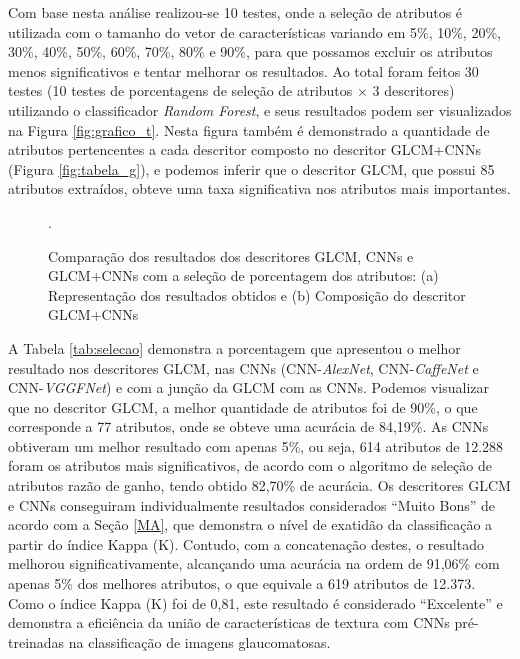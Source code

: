 \documentclass[fleqn,10pt]{SelfArx} %
\begin{document}
Com base nesta análise realizou-se 10 testes, onde a seleção de atributos é utilizada com o tamanho do vetor de características variando em 5\%, 10\%, 20\%, 30\%, 40\%, 50\%, 60\%, 70\%,
80\% e 90\%, para que possamos excluir os atributos menos significativos e tentar melhorar os resultados. 
Ao total foram feitos 30 testes (10 testes de porcentagens de seleção de atributos $\times$ 3 descritores) utilizando o classificador \textit{Random Forest}, e seus resultados podem ser visualizados na Figura \ref{fig:grafico_t}. Nesta figura também é demonstrado a quantidade de atributos pertencentes a cada descritor composto no descritor GLCM+CNNs (Figura \ref{fig:tabela_g}), e podemos inferir que o descritor GLCM, que possui 85 atributos extraídos, obteve uma taxa significativa nos atributos mais importantes.

\begin{figure*}[h!]
	\centering
	
	\caption{Comparação dos resultados dos descritores GLCM, CNNs e GLCM+CNNs com a seleção de porcentagem dos atributos: (a) Representação dos resultados obtidos e (b) Composição do descritor GLCM+CNNs}.
	\label{fig:grafico}
\end{figure*}


A Tabela \ref{tab:selecao} demonstra a porcentagem que apresentou o melhor resultado nos descritores GLCM, nas CNNs (CNN-\textit{AlexNet}, CNN-\textit{CaffeNet} e CNN-\textit{VGGFNet}) e com a junção da GLCM com as CNNs. Podemos visualizar que no descritor GLCM, a melhor quantidade de atributos foi de 90\%, o que corresponde a 77 atributos, onde se obteve uma acurácia de 84,19\%. As CNNs obtiveram um melhor resultado com apenas 5\%, ou seja, 614 atributos de 12.288 foram os atributos mais significativos, de acordo com o algoritmo de seleção de atributos razão de ganho, tendo obtido 82,70\% de acurácia. Os descritores GLCM e CNNs conseguiram individualmente resultados considerados ``Muito Bons'' de acordo com a Seção \ref{MA}, que demonstra o nível de exatidão da classificação a partir do índice Kappa (K). Contudo, com a concatenação destes, o resultado melhorou significativamente, alcançando uma acurácia na ordem de 91,06\% com apenas 5\% dos melhores atributos, o que equivale a 619 atributos de 12.373. Como o índice Kappa (K) foi de 0,81, este resultado é considerado ``Excelente'' e demonstra a eficiência  da união de características de textura com CNNs pré-treinadas na classificação de imagens glaucomatosas.
\end{document}
